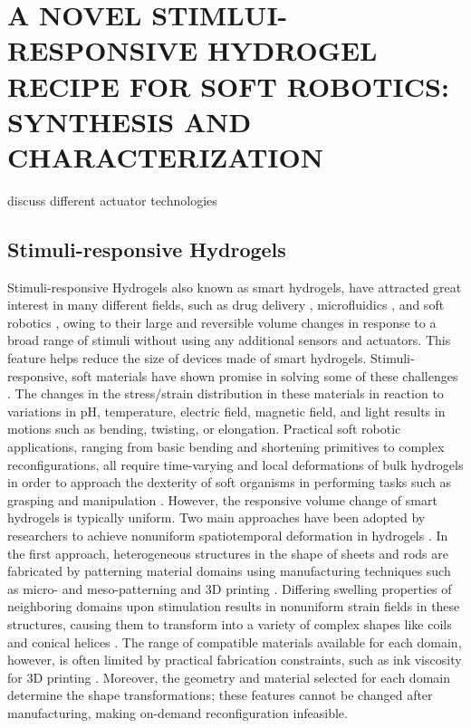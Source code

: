 \chapter{A NOVEL STIMLUI-RESPONSIVE HYDROGEL RECIPE FOR SOFT ROBOTICS: SYNTHESIS AND CHARACTERIZATION}
discuss different actuator technologies
\section{Stimuli-responsive Hydrogels}
Stimuli-responsive Hydrogels also known as smart hydrogels, have attracted great interest in many different fields, such as drug delivery , microfluidics \cite{DEramo2018a,Goy2019}, and soft robotics , owing to their large and reversible volume changes in response to a broad range of stimuli without using any additional sensors and actuators. This feature helps reduce the size of devices made of smart hydrogels. 
Stimuli-responsive, soft materials have shown promise in solving some of these challenges \cite{steele2018stimuli, stuart2010emerging,white2013advances}. The changes in the stress/strain distribution in these materials in reaction to variations in pH, temperature, electric field, magnetic field, and light results in motions such as bending, twisting, or elongation. Practical soft robotic applications, ranging from basic bending and shortening primitives to complex reconfigurations, all require time-varying and local deformations of bulk hydrogels in order to approach the dexterity of 
soft organisms in performing tasks such as grasping and manipulation .
However, the responsive volume change of smart hydrogels is typically uniform.
Two main approaches have been adopted by researchers to achieve nonuniform spatiotemporal deformation in hydrogels . In the first approach, heterogeneous structures in the shape of sheets and rods are fabricated by patterning material domains using manufacturing techniques such as micro- and meso-patterning  and 3D printing . Differing swelling properties of neighboring domains upon stimulation results in nonuniform strain fields in these structures, causing them to transform into a variety of complex shapes like coils and conical helices .
The range of compatible materials available for each domain, however, is often limited by practical fabrication constraints, such as ink viscosity for 3D printing . Moreover, the geometry and material selected for each domain determine the shape transformations; these features cannot be changed after manufacturing, making on-demand reconfiguration infeasible.\\

